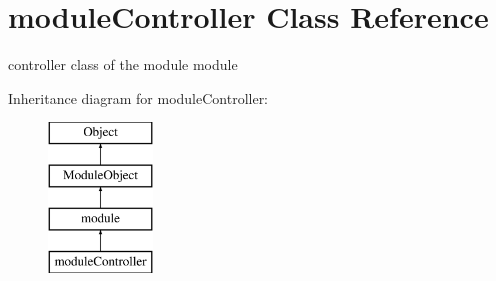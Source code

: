 \hypertarget{classmoduleController}{\section{module\+Controller Class Reference}
\label{classmoduleController}
}


controller class of the module module  


Inheritance diagram for module\+Controller\+:\begin{figure}[H]
\begin{center}
\leavevmode
\includegraphics[height=4.000000cm]{classmoduleController}
\end{center}
\end{figure}
